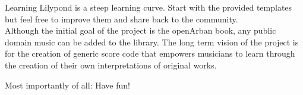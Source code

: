 \documentclass[12pt,a4paper]{article}
\begin{document}
Learning Lilypond is a steep learning curve. Start with the provided templates but feel free to improve them and share back to the community.
\\Although the initial goal of the project is the openArban book, any public domain music can be added to the library. The long term vision of the project is for the creation of generic score code that empowers musicians to learn through the creation of their own interpretations of original works.
\par Most importantly of all: Have fun!
\end{document}

